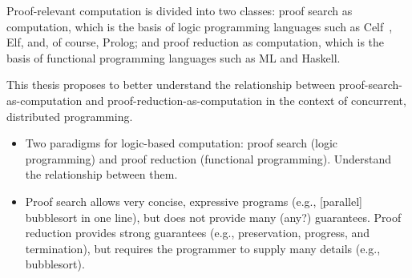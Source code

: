 Proof-relevant computation is divided into two classes: proof search as computation, which is the basis of logic programming languages such as Celf~\autocite{Schack-Nielsen+Schuermann:IJCAR08}, Elf, and, of course, Prolog; and proof reduction as computation, which is the basis of functional programming languages such as ML and Haskell.

This thesis proposes to better understand the relationship between proof-search-as-computation and proof-reduction-as-computation in the context of concurrent, distributed programming.

\begin{itemize}
\item Two paradigms for logic-based computation: proof search (logic programming) and proof reduction (functional programming).
      Understand the relationship between them.
\item Proof search allows very concise, expressive programs (e.g., [parallel] bubblesort in one line), but does not provide many (any?) guarantees.
      Proof reduction provides strong guarantees (e.g., preservation, progress, and termination), but requires the programmer to supply many details (e.g., bubblesort).
\end{itemize}

